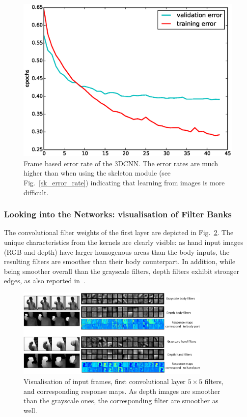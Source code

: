 \begin{figure}[t]
  \centering
  \includegraphics[width=.4\textwidth]{images/3dcnn_filters/training_error}
  \caption{Frame based error rate of the 3DCNN.
 The error rates are much higher than when using the skeleton module (see Fig.~\ref{sk_error_rate})
 indicating that  learning from images is more difficult. }
\label{fig:RGBErrorRate}
\end{figure}

\subsubsection{Looking into the Networks: visualisation of Filter Banks}

The convolutional filter weights of the first layer are depicted in Fig.~\ref{3dcnn_filters}.
The unique characteristics from the kernels are clearly visible: as hand input images (RGB and depth) have larger homogenous areas than the body inputs, the resulting filters are smoother than their body counterpart.
In addition, while being smoother overall than the grayscale filters, depth filters exhibit stronger edges,
 as also reported in~\cite{socher2012convolutional}.

\begin{figure}[t]
  \centering
  \includegraphics[width=0.85\textwidth]{images/CNN_filters}
  \caption{Visualisation of input frames, first convolutional layer $5\times5$ filters, and corresponding response maps.
As depth images are smoother than the grayscale ones, the corresponding filter are smoother as well.
}\label{3dcnn_filters}
\end{figure}


